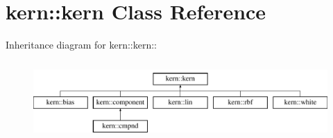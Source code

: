 \hypertarget{classkern_1_1kern}{
\section{kern::kern Class Reference}
\label{classkern_1_1kern}
}
Inheritance diagram for kern::kern::\begin{figure}[H]
\begin{center}
\leavevmode
\includegraphics[height=3cm]{classkern_1_1kern}
\end{center}
\end{figure}
